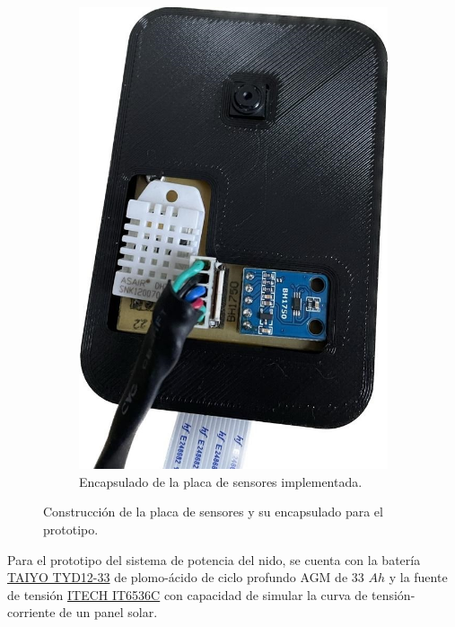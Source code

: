 \begin{figure}[H]
\begin{subfigure}{0.49\textwidth}
        	\includegraphics[width=\linewidth]{ImagenesConstruccion del prototipo/sensores_encapsulado_prototipo_alt}
        	\caption{Encapsulado de la placa de sensores implementada.}
			\label{fig:sensores_encapsulado_prototipo_alt}
        \end{subfigure}
	\caption{Construcción de la placa de sensores y su encapsulado para el prototipo.}
	\label{fig:sensores_prototipado}
\end{figure}

Para el prototipo del sistema de potencia del nido, se cuenta con la batería \href{https://enertik.ar/taiyo-tyd12-33-bateria-electrolito-absorbido-ciclo-profundo-12v-33ah}{TAIYO TYD12-33} de plomo-ácido de ciclo profundo AGM de 33 $Ah$ y la fuente de tensión \href{https://www.itech.sh/en/product/dc-power-supply/IT6500.html}{ITECH IT6536C} con capacidad de simular la curva de tensión-corriente de un panel solar.

